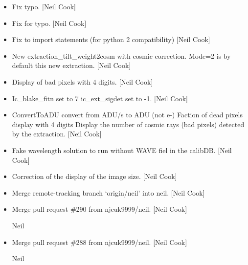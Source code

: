 \documentclass[a4paper,10pt,english]{report}
\begin{document}
\begin{itemize}
\item {} 
Fix typo. {[}Neil Cook{]}

\item {} 
Fix for typo. {[}Neil Cook{]}

\item {} 
Fix to import statements (for python 2 compatibility) {[}Neil Cook{]}

\item {} 
New extraction\_tilt\_weight2cosm with cosmic correction. Mode=2 is by
default this new extraction. {[}Neil Cook{]}

\item {} 
Display of bad pixels with 4 digits. {[}Neil Cook{]}

\item {} 
Ic\_blake\_fitn set to 7 ic\_ext\_sigdet set to -1. {[}Neil Cook{]}

\item {} 
ConvertToADU convert from ADU/s to ADU (not e-) Faction of dead pixels
display with 4 digits Display the number of cosmic rays (bad pixels)
detected by the extraction. {[}Neil Cook{]}

\item {} 
Fake wavelength solution to run without WAVE fiel in the calibDB.
{[}Neil Cook{]}

\item {} 
Correction of the display of the image size. {[}Neil Cook{]}

\item {} 
Merge remote-tracking branch ‘origin/neil’ into neil. {[}Neil Cook{]}

\item {} 
Merge pull request \#290 from njcuk9999/neil. {[}Neil Cook{]}

Neil

\item {} 
Merge pull request \#288 from njcuk9999/neil. {[}Neil Cook{]}

Neil

\end{itemize}
\end{document}
